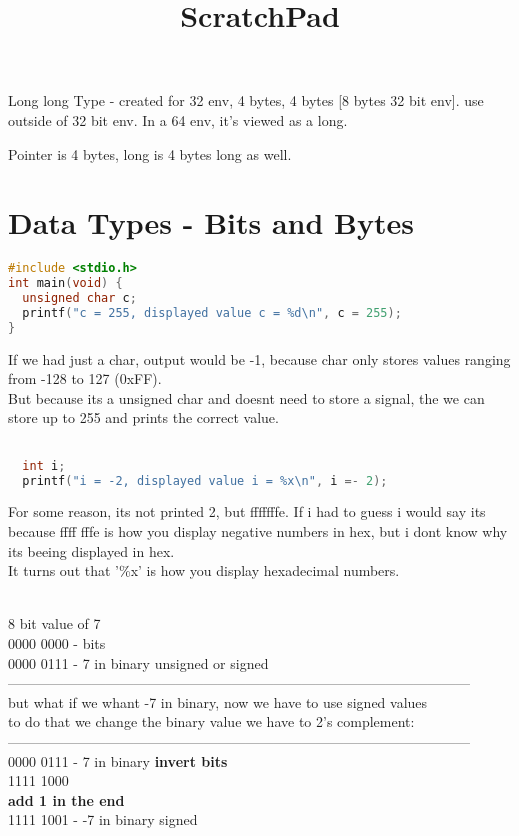 \documentclass[12pt]{article}
\begin{document}
\vspace{10mm}

Long long Type - created for 32 env, 4 bytes, 4 bytes [8 bytes 32 bit env].
use outside of 32 bit env. In a 64 env, it's viewed as a long.

Pointer is 4 bytes, long is 4 bytes long as well.

\newpage

\section{Data Types - Bits and Bytes}

\begin{lstlisting}[language=C, title=testing data types]
#include <stdio.h>
int main(void) {
  unsigned char c;
  printf("c = 255, displayed value c = %d\n", c = 255);
}
\end{lstlisting}
If we had just a char, output would be -1, because char only stores values ranging from -128 to 127 (0xFF). \\ But because its a unsigned char and doesnt need to store a signal, the we can store up to 255 and prints the correct value.


\begin{lstlisting}[language=C, title=code]

  int i;
  printf("i = -2, displayed value i = %x\n", i =- 2);

\end{lstlisting}
For some reason, its not printed 2, but fffffffe. If i had to guess i would say its because ffff fffe is how you display negative numbers in hex, but i dont know why its beeing displayed in hex. \\It turns out that '\%x' is how you display hexadecimal numbers.



\vspace{20mm}

\newpage

\title{\textbf{ScratchPad}}\\
8 bit value of 7\\
0000 0000 - bits\\
0000 0111 - 7 in binary unsigned or signed\\
---------------------------------------------------------------------------------------------------\\ 
but what if we whant -7 in binary, now we have to use signed values\\
to do that we change the binary value we have to 2's complement:\\
---------------------------------------------------------------------------------------------------\\ 
0000 0111 - 7 in binary
\textbf{invert bits}\\
1111 1000\\
\textbf{add 1 in the end}\\
1111 1001 - -7 in binary signed
\end{document}
